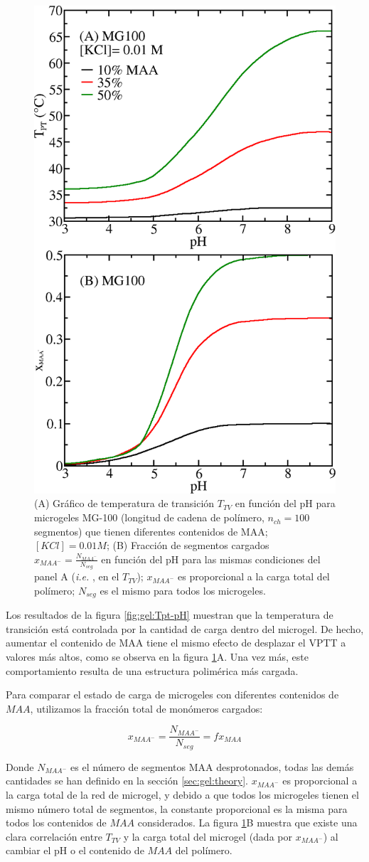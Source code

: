 \begin{figure}[!tb]
	\centering
	\includegraphics[width=0.5\linewidth]{Figures/graph-gel/Tpt-pH_MAA.png}
	\caption{(A) Gr\'afico de temperatura de transici\'on $T_{TV}$ en funci\'on del pH para microgeles MG-100 (longitud de cadena de pol\'imero, $n_{ch}=100$ segmentos) que tienen diferentes contenidos de MAA; $[KCl]=0.01 M$;
	(B) Fracci\'on de segmentos cargados $x_{MAA^-}=\frac{N_{MAA^-}}{N_{seg}}$ en funci\'on del pH para las mismas condiciones del panel A (\emph{i.e.} , en el $T_{TV}$); $x_{MAA^-}$ es proporcional a la carga total del pol\'imero; $N_{seg}$ es el mismo para todos los microgeles.}
	\label{fig:gel:Tpt_MAA}
\end{figure}

Los resultados de la figura \ref{fig:gel:Tpt-pH} muestran que la temperatura de transici\'on est\'a controlada por la cantidad de carga dentro del microgel. De hecho, aumentar el contenido de MAA tiene el mismo efecto de desplazar el VPTT a valores m\'as altos, como se observa en la figura \ref{fig:gel:Tpt_MAA}A. Una vez m\'as, este comportamiento resulta de una estructura polim\'erica m\'as cargada.

Para comparar el estado de carga de microgeles con diferentes contenidos de $MAA$, utilizamos la fracci\'on total de mon\'omeros cargados:

\begin{equation}
	x_{MAA^-}=\frac{N_{MAA^-}}{N_{seg}}=f x_{MAA}
\end{equation}

Donde $N_{MAA^-}$ es el n\'umero de segmentos MAA desprotonados, todas las dem\'as cantidades se han definido en la secci\'on \ref{sec:gel:theory}. $x_{MAA^-}$ es proporcional a la carga total de la red de microgel, y debido a que todos los microgeles tienen el mismo n\'umero total de segmentos, la constante proporcional es la misma para todos los contenidos de $MAA$ considerados. La figura \ref{fig:gel:Tpt_MAA}B muestra que existe una clara correlaci\'on entre $T_{TV}$ y la carga total del microgel (dada por $x_{MAA^-}$) al cambiar el pH o el contenido de $MAA$ del pol\'imero.


